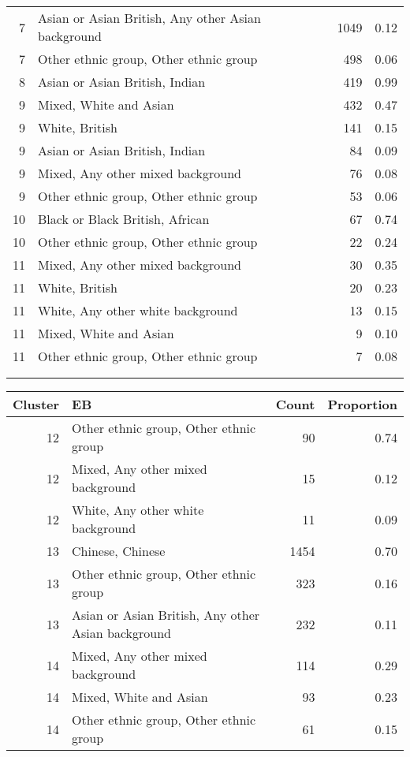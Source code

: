 \begin{table}[ht]
{\begin{tabular}[t]{rlrr}
    7 & Asian or Asian British, Any other Asian background & 1049 & 0.12 \\ 
    7 & Other ethnic group, Other ethnic group & 498 & 0.06 \\ 
    8 & Asian or Asian British, Indian & 419 & 0.99 \\ 
    9 & Mixed, White and Asian & 432 & 0.47 \\ 
    9 & White, British & 141 & 0.15 \\ 
    9 & Asian or Asian British, Indian &  84 & 0.09 \\ 
    9 & Mixed, Any other mixed background &  76 & 0.08 \\ 
    9 & Other ethnic group, Other ethnic group &  53 & 0.06 \\ 
   10 & Black or Black British, African &  67 & 0.74 \\ 
   10 & Other ethnic group, Other ethnic group &  22 & 0.24 \\ 
   11 & Mixed, Any other mixed background &  30 & 0.35 \\ 
   11 & White, British &  20 & 0.23 \\ 
   11 & White, Any other white background &  13 & 0.15 \\ 
   11 & Mixed, White and Asian &   9 & 0.10 \\ 
   11 & Other ethnic group, Other ethnic group &   7 & 0.08 \\ 
    & & & \\
    & & & \\
   \hline
   \end{tabular}
   \begin{tabular}[t]{rlrr}
  \hline
Cluster & EB & Count & Proportion \\ 
  \hline
12 & Other ethnic group, Other ethnic group &  90 & 0.74 \\ 
   12 & Mixed, Any other mixed background &  15 & 0.12 \\ 
   12 & White, Any other white background &  11 & 0.09 \\ 
   13 & Chinese, Chinese & 1454 & 0.70 \\ 
   13 & Other ethnic group, Other ethnic group & 323 & 0.16 \\ 
   13 & Asian or Asian British, Any other Asian background & 232 & 0.11 \\ 
   14 & Mixed, Any other mixed background & 114 & 0.29 \\ 
   14 & Mixed, White and Asian &  93 & 0.23 \\ 
   14 & Other ethnic group, Other ethnic group &  61 & 0.15 \\ 

\end{tabular}}
\end{table}
